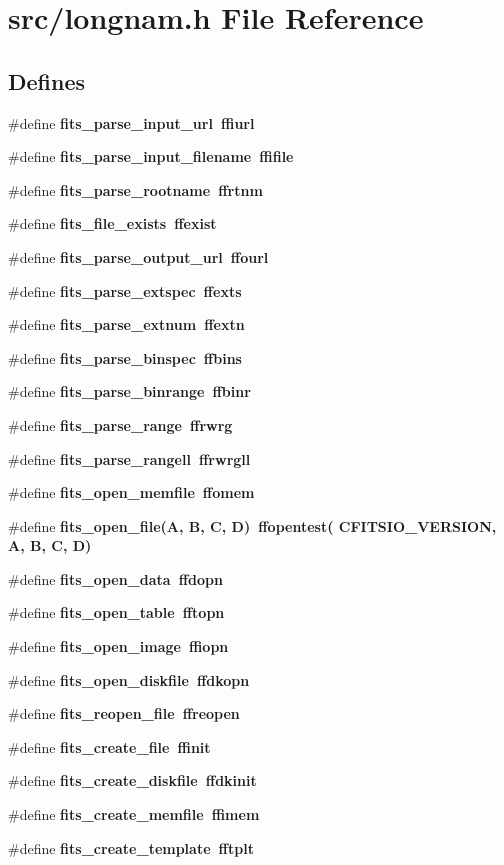 \section{src/longnam.h File Reference}
\label{src_2longnam_8h}
\subsection*{Defines}
\begin{CompactItemize}
\item 
\#define \bf{fits\_\-parse\_\-input\_\-url}~ffiurl
\item 
\#define \bf{fits\_\-parse\_\-input\_\-filename}~ffifile
\item 
\#define \bf{fits\_\-parse\_\-rootname}~ffrtnm
\item 
\#define \bf{fits\_\-file\_\-exists}~ffexist
\item 
\#define \bf{fits\_\-parse\_\-output\_\-url}~ffourl
\item 
\#define \bf{fits\_\-parse\_\-extspec}~ffexts
\item 
\#define \bf{fits\_\-parse\_\-extnum}~ffextn
\item 
\#define \bf{fits\_\-parse\_\-binspec}~ffbins
\item 
\#define \bf{fits\_\-parse\_\-binrange}~ffbinr
\item 
\#define \bf{fits\_\-parse\_\-range}~ffrwrg
\item 
\#define \bf{fits\_\-parse\_\-rangell}~ffrwrgll
\item 
\#define \bf{fits\_\-open\_\-memfile}~ffomem
\item 
\#define \bf{fits\_\-open\_\-file}(A, B, C, D)~ffopentest( CFITSIO\_\-VERSION, A, B, C, D)
\item 
\#define \bf{fits\_\-open\_\-data}~ffdopn
\item 
\#define \bf{fits\_\-open\_\-table}~fftopn
\item 
\#define \bf{fits\_\-open\_\-image}~ffiopn
\item 
\#define \bf{fits\_\-open\_\-diskfile}~ffdkopn
\item 
\#define \bf{fits\_\-reopen\_\-file}~ffreopen
\item 
\#define \bf{fits\_\-create\_\-file}~ffinit
\item 
\#define \bf{fits\_\-create\_\-diskfile}~ffdkinit
\item 
\#define \bf{fits\_\-create\_\-memfile}~ffimem
\item 
\#define \bf{fits\_\-create\_\-template}~fftplt

\end{CompactItemize}
